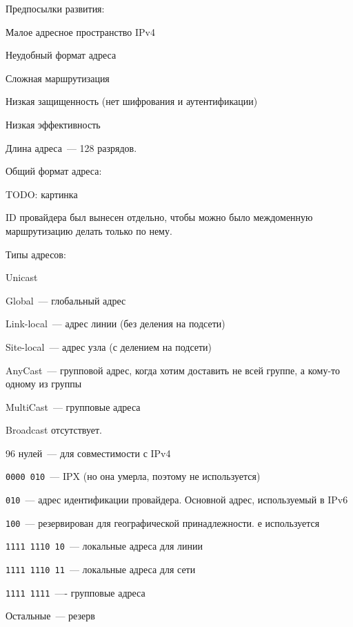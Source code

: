 
Предпосылки развития:
\begin{MyItemize}
    \item Малое адресное пространство IPv4
    \item Неудобный формат адреса
    \item Сложная маршрутизация
    \item Низкая защищенность (нет шифрования и аутентификации)
    \item Низкая эффективность
\end{MyItemize}


Длина адреса~--- 128 разрядов.

Общий формат адреса:

TODO: картинка

ID провайдера был вынесен отдельно, чтобы можно было междоменную маршрутизацию делать только по нему.

Типы адресов:

\begin{MyItemize}
    \item Unicast
    \begin{MyItemize}
        \item Global~--- глобальный адрес
        \item Link-local~--- адрес линии (без деления на подсети)
        \item Site-local~--- адрес узла (с делением на подсети)
    \end{MyItemize}
    \item AnyCast~--- групповой адрес, когда хотим доставить не всей группе, а кому-то одному из группы
    \item MultiCast~--- групповые адреса
\end{MyItemize}

Broadcast отсутствует.


\begin{MyItemize}
    \item 96 нулей~--- для совместимости с IPv4
    \item {\tt 0000 010}~--- IPX (но она умерла, поэтому не используется)
    \item {\tt 010}~--- адрес идентификации провайдера. Основной адрес, используемый в IPv6
    \item {\tt 100}~--- резервирован для географической принадлежности. е используется
    \item {\tt 1111 1110 10}~--- локальные адреса для линии
    \item {\tt 1111 1110 11}~--- локальные адреса для сети
    \item {\tt 1111 1111}~---- групповые адреса
    \item Остальные~--- резерв
\end{MyItemize}

